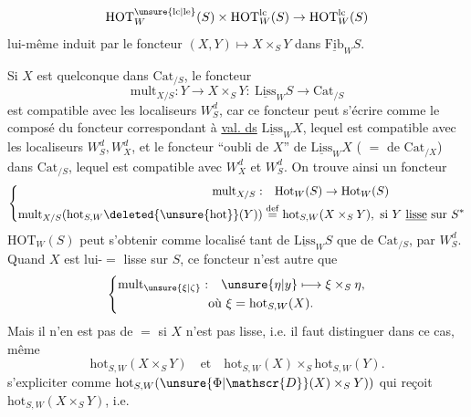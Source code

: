 \[
\mathrm{HOT}^{\unsure{\mathrm{lc}|\mathrm{le}}}_W(S)\times\mathrm{HOT}^{\mathrm{lc}}_W(S)\to\mathrm{HOT}^{\mathrm{lc}}_W(S)
\]
lui-même induit par le foncteur  $(X,Y)\mapsto X\times_S Y$ dans $\underline{\mathrm{Fib}}_W S$.

Si $X$ est quelconque dans $\mathrm{Cat}_{/S}$, le foncteur
\[
\mathrm{mult}_{X/S}:Y\to X\times_S Y:\ \underline{\mathrm{Liss}}_W S\to\mathrm{Cat}_{/S}
\]
est compatible avec les localiseurs $W_S^d$, car ce foncteur peut s'écrire comme le composé du foncteur correspondant à \uline{val. ds}  $\underline{\mathrm{Liss}}_W X$, lequel est compatible avec les localiseurs $W_S^d,W_X^d$, et le foncteur ``oubli de $X$'' de $\underline{\mathrm{Liss}}_W X$ ( $=$ de $\mathrm{Cat}_{/X}$) dans $\mathrm{Cat}_{/S}$, lequel est compatible avec $W_X^d$ et $W_S^d$. On trouve ainsi un foncteur
\[
\left\{\begin{aligned}
\mathrm{mult}_{X/S}:&\quad\mathrm{Hot}_W(S)\to\mathrm{Hot}_W(S)\\
\mathrm{mult}_{X/S}(\mathrm{hot}_{S,W}\deleted{\unsure{\mathrm{hot}}}(Y))&\overset{\mathrm{def}}{=}\mathrm{hot}_{S,W}(X\times_S Y),\ \text{si }Y\ \underline{\text{lisse}}\text{ sur }S^{*}
\end{aligned}\right.
\]
  $\mathrm{HOT}_W(S)$ peut s'obtenir comme localisé tant de $\underline{\mathrm{Liss}}_W S$ que de $\mathrm{Cat}_{/S}$, par $W_S^d$. Quand $X$ est lui-$=$ lisse sur  $S$, ce foncteur n'est autre que
\[
\left\{\begin{aligned}
\mathrm{mult}_{\unsure{\xi|\zeta}}:&\quad\unsure{\eta|y}\longmapsto\xi\times_S\eta,\\
&\text{où }\xi=\mathrm{hot}_{S,W}(X).
\end{aligned}\right.
\]
Mais il n'en est pas de $=$ si $X$ n'est pas lisse, i.e. il faut distinguer dans ce cas, même 
\[
\mathrm{hot}_{S,W}(X\times_S Y)\quad\text{et}\quad\mathrm{hot}_{S,W}(X)\times_S\mathrm{hot}_{S,W}(Y).
\]
  s'expliciter comme $\mathrm{hot}_{S,W}(\unsure{\Phi|\mathscr{D}}(X)\times_S Y))$ qui reçoit $\mathrm{hot}_{S,W}(X\times_S Y)$, i.e.

